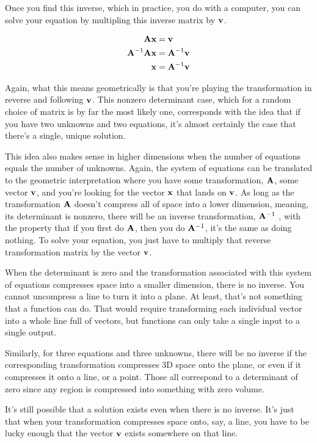 Once you find this inverse, which in practice, you do with a computer, you can
solve your equation by multipling this inverse matrix by $\mathbf{v}$.

\begin{align*}
  \mathbf{A}\mathbf{x} &= \mathbf{v} \\
  \mathbf{A}^{-1}\mathbf{A}\mathbf{x} &= \mathbf{A}^{-1}\mathbf{v} \\
  \mathbf{x} &= \mathbf{A}^{-1}\mathbf{v}
\end{align*}

Again, what this means geometrically is that you're playing the transformation
in reverse and following $\mathbf{v}$. This nonzero determinant case, which for a
random choice of matrix is by far the most likely one, corresponds with the idea
that if you have two unknowns and two equations, it's almost certainly the case
that there's a single, unique solution.

This idea also makes sense in higher dimensions when the number of equations
equals the number of unknowns. Again, the system of equations can be translated
to the geometric interpretation where you have some transformation, $\mathbf{A}$,
some vector $\mathbf{v}$, and you're looking for the vector $\mathbf{x}$ that lands on
$\mathbf{v}$. As long as the transformation $\mathbf{A}$ doesn't compress all of
space into a lower dimension, meaning, its determinant is nonzero, there will be
an inverse transformation, $\mathbf{A}^{-1}$ , with the property that if you first
do $\mathbf{A}$, then you do $\mathbf{A}^{-1}$, it's the same as doing nothing. To
solve your equation, you just have to multiply that reverse transformation
matrix by the vector $\mathbf{v}$.

When the determinant is zero and the transformation associated with this system
of equations compresses space into a smaller dimension, there is no inverse. You
cannot uncompress a line to turn it into a plane. At least, that's not something
that a function can do. That would require transforming each individual vector
into a whole line full of vectors, but functions can only take a single input to
a single output.

Similarly, for three equations and three unknowns, there will be no inverse if
the corresponding transformation compresses 3D space onto the plane, or even if
it compresses it onto a line, or a point. Those all correspond to a determinant
of zero since any region is compressed into something with zero volume.

It's still possible that a solution exists even when there is no inverse. It's
just that when your transformation compresses space onto, say, a line, you have
to be lucky enough that the vector $\mathbf{v}$ exists somewhere on that line.

